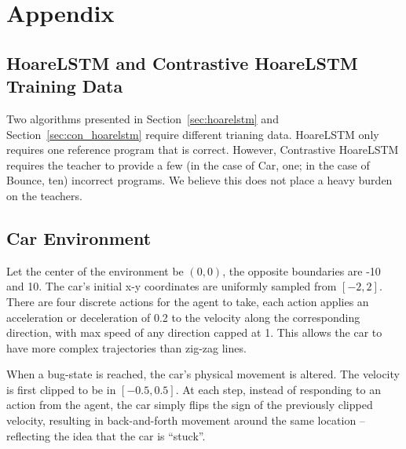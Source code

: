 \documentclass{article}
\begin{document}



\clearpage

\appendix

\section{Appendix}


\subsection{HoareLSTM and Contrastive HoareLSTM Training Data}

Two algorithms presented in Section~\ref{sec:hoarelstm} and Section~\ref{sec:con_hoarelstm} require different trianing data. HoareLSTM only requires one reference program that is correct. However, Contrastive HoareLSTM requires the teacher to provide a few (in the case of Car, one; in the case of Bounce, ten) incorrect programs. We believe this does not place a heavy burden on the teachers.

\subsection{Car Environment}

Let the center of the environment be $(0, 0)$, the opposite boundaries are -10 and 10. The car's initial x-y coordinates are uniformly sampled from $[-2, 2]$. There are four discrete actions for the agent to take, each action applies an acceleration or deceleration of 0.2 to the velocity along the corresponding direction, with max speed of any direction capped at 1. This allows the car to have more complex trajectories than zig-zag lines. 

When a bug-state is reached, the car's physical movement is altered. The velocity is first clipped to be in $[-0.5, 0.5]$. At each step, instead of responding to an action from the agent, the car simply flips the sign of the previously clipped velocity, resulting in back-and-forth movement around the same location -- reflecting the idea that the car is ``stuck''.
\end{document}
